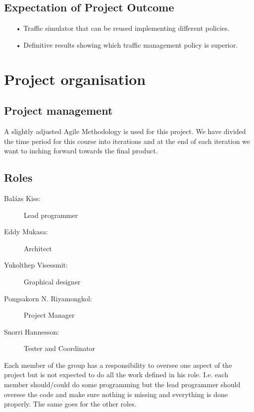 \documentclass[11pt]{article}
\begin{document}
\subsection{Expectation of Project Outcome}
\begin{itemize}
\item[•] Traffic simulator that can be reused implementing different policies.
\item[•] Definitive results showing which traffic management policy is superior. 
\end{itemize}



\section{Project organisation}
\subsection{Project management}
A slightly adjusted Agile Methodology is used for this project. We have divided the time period for this course into iterations and at the end of each iteration we want to inching forward towards the final product.

\subsection{Roles}

\begin{description}
\item[Balázs Kiss:] Lead programmer
\item[Eddy Mukasa:] Architect
\item[Yukolthep Visessmit:] Graphical designer
\item[Pongsakorn N. Riyamongkol:] Project Manager
\item[Snorri Hannesson:] Tester and Coordinator
\end{description}

Each member of the group has a responsibility to oversee one aspect of the project but is not expected to do all the work defined in his role. I.e. each member should/could do some programming but the lead programmer should oversee the code and make sure nothing is missing and everything is done properly. The same goes for the other roles.
\end{document}

